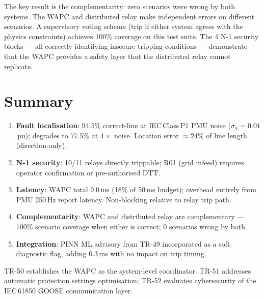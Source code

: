 \documentclass[11pt,a4paper]{article}
\begin{document}
\medskip\noindent
The key result is the complementarity: zero scenarios were wrong by both
systems.  The WAPC and distributed relay make independent errors on different
scenarios.  A supervisory voting scheme (trip if either system agrees with
the physics constraints) achieves 100\% coverage on this test suite.  The
4 N-1 security blocks — all correctly identifying insecure tripping conditions
— demonstrate that the WAPC provides a safety layer that the distributed relay
cannot replicate.

\section{Summary}
\label{sec:summary}

\begin{enumerate}
  \item \textbf{Fault localisation}: 94.5\% correct-line at IEC\,Class\,P1
    PMU noise ($\sigma_V=0.01$\,pu); degrades to 77.5\% at $4\times$ noise.
    Location error $\approx$24\% of line length (direction-only).

  \item \textbf{N-1 security}: 10/11 relays directly trippable; R01 (grid
    infeed) requires operator confirmation or pre-authorised DTT.

  \item \textbf{Latency}: WAPC total 9.0\,ms (18\% of 50\,ms budget);
    overhead entirely from PMU 250\,Hz report latency.  Non-blocking relative
    to relay trip path.

  \item \textbf{Complementarity}: WAPC and distributed relay are complementary
    — 100\% scenario coverage when either is correct; 0 scenarios wrong by
    both.

  \item \textbf{Integration}: PINN ML advisory from TR-49 incorporated as
    a soft diagnostic flag, adding 0.3\,ms with no impact on trip timing.
\end{enumerate}

\noindent
TR-50 establishes the WAPC as the system-level coordinator.  TR-51 addresses
automatic protection settings optimisation; TR-52 evaluates cybersecurity
of the IEC\,61850 GOOSE communication layer.



\end{document}
